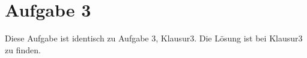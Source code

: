 \section*{Aufgabe 3}

Diese Aufgabe ist identisch zu Aufgabe 3, Klausur3.
Die Lösung ist bei Klausur3 zu finden.
